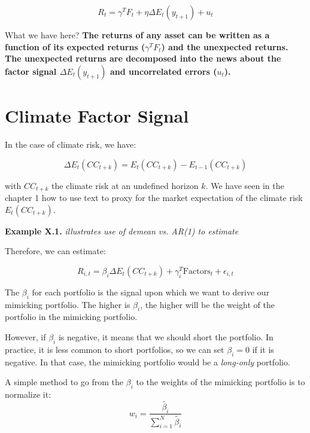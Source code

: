 \begin{equation}
    R_t = \gamma^T F_{t} + \eta \Delta E_t(y_{t+1}) + u_{t}
\end{equation}

What we have here? 
\textbf{The returns of any asset can be written 
as a function of its expected returns ($\gamma^T F_{t}$)
and the unexpected returns. The unexpected returns are 
decomposed into the news about the factor signal $\Delta E_t (y_{t+1})$ and
uncorrelated errors ($u_t$).}

\section{Climate Factor Signal}

In the case of climate risk, we have:

\begin{equation}
    \Delta E_t (CC_{t+k}) = E_t (CC_{t+k}) - E_{t-1} (CC_{t+k})
\end{equation}

with $CC_{t+k}$ the climate risk at an undefined horizon $k$.
We have seen in the chapter 1 how to use text to proxy for 
the market expectation of the climate risk $E_t(CC_{t+k})$.


\begin{examplebox}
    \textbf{Example X.1.}    
    \textit{illustrates use of demean vs. AR(1) to estimate}
\end{examplebox}


Therefore, we can estimate:

\begin{equation}
    R_{i,t} = \beta_i \Delta E_t(CC_{t+k}) + \gamma_i^T \text{Factors}_t + \epsilon_{i,t}
\end{equation}

The $\beta_i$ for each portfolio is the signal 
upon which we want to derive our mimicking portfolio.
The higher is $\beta_i$, the higher will be the weight 
of the portfolio in the mimicking portfolio.

However, if $\beta_i$ is negative, it means that
we should short the portfolio. In practice, 
it is less common to short portfolios, so we
can set $\beta_i = 0$ if it is negative. In that 
case, the mimicking portfolio would be a \textit{long-only}
portfolio.

A simple method to go from the $\beta_i$ to the
weights of the mimicking portfolio is to normalize it:
\begin{equation}
    w_i = \frac{\tilde{\beta_i}}{\sum_{i=1}^{N} \tilde{\beta_i}}
\end{equation}

